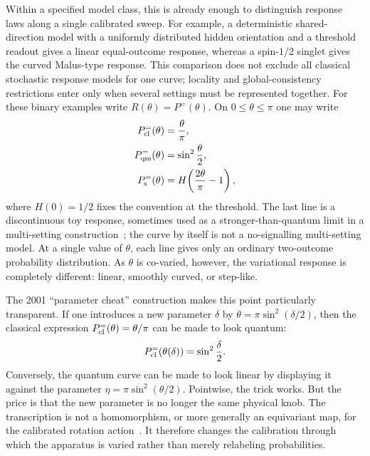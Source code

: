 \documentclass[aps,pra,reprint,superscriptaddress,nofootinbib,floatfix]{revtex4-2}
\begin{document}
Within a specified model class, this is already enough to distinguish
response laws along a single calibrated sweep.  For example, a deterministic
shared-direction model with a uniformly distributed hidden orientation and a
threshold readout gives a linear equal-outcome response, whereas a spin-\(1/2\)
singlet gives the curved Malus-type response.  This comparison does not
exclude all classical stochastic response models for one curve; locality and
global-consistency restrictions enter only when several settings must be
represented together.  For these binary examples write
\(R(\theta)=P^{=}(\theta)\).  On \(0\le\theta\le\pi\) one may write
\begin{equation}
\begin{aligned}
        P^{=}_{\rm cl}(\theta)&=\frac{\theta}{\pi},\\
        P^{=}_{\rm qm}(\theta)&=\sin^2\frac{\theta}{2},\\
        P^{=}_{\rm s}(\theta)&=
        H\!\left(\frac{2\theta}{\pi}-1\right),
\end{aligned}
\label{eq:three-response-curves}
\end{equation}
where \(H(0)=1/2\) fixes the convention at the threshold.  The last line is a
discontinuous toy response, sometimes used as a stronger-than-quantum limit
in a multi-setting construction~\cite{svozil-krenn}; the curve by itself is
not a no-signalling multi-setting model.  At a single value of \(\theta\),
each line gives only an ordinary two-outcome probability distribution.  As
\(\theta\) is co-varied, however, the variational response is completely
different: linear, smoothly curved, or step-like.

The 2001 ``parameter cheat'' construction makes this point particularly
transparent.  If one introduces a new parameter \(\delta\) by
\(\theta=\pi\sin^2(\delta/2)\), then the classical expression
\(P^{=}_{\rm cl}(\theta)=\theta/\pi\) can be made to look quantum:
\[
        P^{=}_{\rm cl}(\theta(\delta))
        =
        \sin^2\frac{\delta}{2}.
\]
Conversely, the quantum curve can be made to look linear by displaying it
against the parameter
\(\eta=\pi\sin^2(\theta/2)\).  Pointwise, the trick works.  But the price is
that the new parameter is no longer the same physical knob.  The
transcription is not a homomorphism, or more generally an equivariant map, for
the calibrated rotation action~\cite{svozil-2001-cesena}.  It therefore
changes the calibration through which the apparatus is varied rather than
merely relabeling probabilities.
\end{document}
